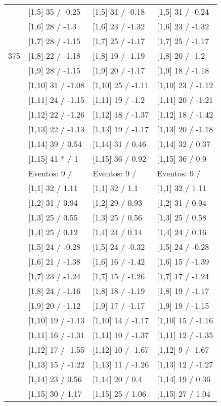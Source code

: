 \begin{table}
\begin{tabular}[t]{llll}
 & {}[1,5] 35  / -0.25 & {}[1,5] 31  / -0.18 & {}[1,5] 31  / -0.24\\
 & {}[1,6] 28  / -1.3 & {}[1,6] 23  / -1.32 & {}[1,6] 23  / -1.32\\
 & {}[1,7] 28  / -1.15 & {}[1,7] 25  / -1.17 & {}[1,7] 25  / -1.17\\
375 & {}[1,8] 22  / -1.18 & {}[1,8] 19  / -1.19 & {}[1,8] 20  / -1.2\\
\addlinespace
 & {}[1,9] 28  / -1.15 & {}[1,9] 20  / -1.17 & {}[1,9] 18  / -1.18\\
 & {}[1,10] 31  / -1.08 & {}[1,10] 25  / -1.11 & {}[1,10] 23  / -1.12\\
 & {}[1,11] 24  / -1.15 & {}[1,11] 19  / -1.2 & {}[1,11] 20  / -1.21\\
 & {}[1,12] 22  / -1.26 & {}[1,12] 18  / -1.37 & {}[1,12] 18  / -1.42\\
 & {}[1,13] 22  / -1.13 & {}[1,13] 19  / -1.17 & {}[1,13] 20  / -1.18\\
\addlinespace
 & {}[1,14] 39  / 0.54 & {}[1,14] 31  / 0.46 & {}[1,14] 32  / 0.37\\
 & {}[1,15] 41 * / 1 & {}[1,15] 36  / 0.92 & {}[1,15] 36  / 0.9\\
 & Eventos:  9 / & Eventos:  9 / & Eventos:  9 /\\
 & {}[1,1] 32  / 1.11 & {}[1,1] 32  / 1.1 & {}[1,1] 32  / 1.11\\
 & {}[1,2] 31  / 0.94 & {}[1,2] 29  / 0.93 & {}[1,2] 31  / 0.94\\
\addlinespace
 & {}[1,3] 25  / 0.55 & {}[1,3] 25  / 0.56 & {}[1,3] 25  / 0.58\\
 & {}[1,4] 25  / 0.12 & {}[1,4] 24  / 0.14 & {}[1,4] 24  / 0.16\\
 & {}[1,5] 24  / -0.28 & {}[1,5] 24  / -0.32 & {}[1,5] 24  / -0.28\\
 & {}[1,6] 21  / -1.38 & {}[1,6] 16  / -1.42 & {}[1,6] 15  / -1.39\\
 & {}[1,7] 23  / -1.24 & {}[1,7] 15  / -1.26 & {}[1,7] 17  / -1.24\\
\addlinespace
500 & {}[1,8] 24  / -1.16 & {}[1,8] 18  / -1.19 & {}[1,8] 19  / -1.17\\
 & {}[1,9] 20  / -1.12 & {}[1,9] 17  / -1.17 & {}[1,9] 19  / -1.15\\
 & {}[1,10] 19  / -1.13 & {}[1,10] 14  / -1.17 & {}[1,10] 15  / -1.16\\
 & {}[1,11] 16  / -1.31 & {}[1,11] 10  / -1.37 & {}[1,11] 12  / -1.35\\
 & {}[1,12] 17  / -1.55 & {}[1,12] 10  / -1.67 & {}[1,12] 9  / -1.67\\
\addlinespace
 & {}[1,13] 15  / -1.22 & {}[1,13] 11  / -1.26 & {}[1,13] 12  / -1.27\\
 & {}[1,14] 23  / 0.56 & {}[1,14] 20  / 0.4 & {}[1,14] 19  / 0.36\\
 & {}[1,15] 30  / 1.17 & {}[1,15] 25  / 1.06 & {}[1,15] 27  / 1.04\\
\bottomrule
\end{tabular}
\end{table}
